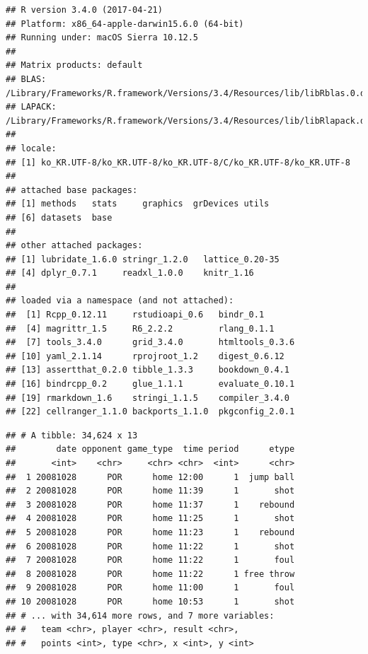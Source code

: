 \documentclass[10pt,]{krantz}
\makeatletter
\newenvironment{Shaded}{\begin{snugshade}}{\end{snugshade}}
\newcommand{\StringTok}[1]{\textcolor[rgb]{0.31,0.60,0.02}{#1}}
\newcommand{\CommentTok}[1]{\textcolor[rgb]{0.56,0.35,0.01}{\textit{#1}}}
\newcommand{\OperatorTok}[1]{\textcolor[rgb]{0.81,0.36,0.00}{\textbf{#1}}}
\newcommand{\NormalTok}[1]{#1}
\newenvironment{kframe}{%
\medskip{}
\setlength{\fboxsep}{.8em}
 \def\at@end@of@kframe{}%
 \ifinner\ifhmode%
  \def\at@end@of@kframe{\end{minipage}}%
  \begin{minipage}{\columnwidth}%
 \fi\fi%
 \def\FrameCommand##1{\hskip\@totalleftmargin \hskip-\fboxsep
 \colorbox{shadecolor}{##1}\hskip-\fboxsep
     \hskip-\linewidth \hskip-\@totalleftmargin \hskip\columnwidth}%
 \MakeFramed {\advance\hsize-\width
   \@totalleftmargin\z@ \linewidth\hsize
   \@setminipage}}%
 {\par\unskip\endMakeFramed%
 \at@end@of@kframe}
\renewenvironment{Shaded}{\begin{kframe}}{\end{kframe}}
\makeatother
\begin{document}
\begin{verbatim}
## R version 3.4.0 (2017-04-21)
## Platform: x86_64-apple-darwin15.6.0 (64-bit)
## Running under: macOS Sierra 10.12.5
## 
## Matrix products: default
## BLAS: /Library/Frameworks/R.framework/Versions/3.4/Resources/lib/libRblas.0.dylib
## LAPACK: /Library/Frameworks/R.framework/Versions/3.4/Resources/lib/libRlapack.dylib
## 
## locale:
## [1] ko_KR.UTF-8/ko_KR.UTF-8/ko_KR.UTF-8/C/ko_KR.UTF-8/ko_KR.UTF-8
## 
## attached base packages:
## [1] methods   stats     graphics  grDevices utils    
## [6] datasets  base     
## 
## other attached packages:
## [1] lubridate_1.6.0 stringr_1.2.0   lattice_0.20-35
## [4] dplyr_0.7.1     readxl_1.0.0    knitr_1.16     
## 
## loaded via a namespace (and not attached):
##  [1] Rcpp_0.12.11     rstudioapi_0.6   bindr_0.1       
##  [4] magrittr_1.5     R6_2.2.2         rlang_0.1.1     
##  [7] tools_3.4.0      grid_3.4.0       htmltools_0.3.6 
## [10] yaml_2.1.14      rprojroot_1.2    digest_0.6.12   
## [13] assertthat_0.2.0 tibble_1.3.3     bookdown_0.4.1  
## [16] bindrcpp_0.2     glue_1.1.1       evaluate_0.10.1 
## [19] rmarkdown_1.6    stringi_1.1.5    compiler_3.4.0  
## [22] cellranger_1.1.0 backports_1.1.0  pkgconfig_2.0.1
\end{verbatim}

\begin{Shaded}
\end{Shaded}

\begin{verbatim}
## # A tibble: 34,624 x 13
##        date opponent game_type  time period      etype
##       <int>    <chr>     <chr> <chr>  <int>      <chr>
##  1 20081028      POR      home 12:00      1  jump ball
##  2 20081028      POR      home 11:39      1       shot
##  3 20081028      POR      home 11:37      1    rebound
##  4 20081028      POR      home 11:25      1       shot
##  5 20081028      POR      home 11:23      1    rebound
##  6 20081028      POR      home 11:22      1       shot
##  7 20081028      POR      home 11:22      1       foul
##  8 20081028      POR      home 11:22      1 free throw
##  9 20081028      POR      home 11:00      1       foul
## 10 20081028      POR      home 10:53      1       shot
## # ... with 34,614 more rows, and 7 more variables:
## #   team <chr>, player <chr>, result <chr>,
## #   points <int>, type <chr>, x <int>, y <int>
\end{verbatim}
\end{document}
